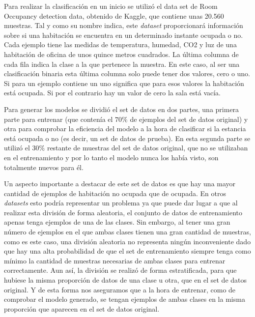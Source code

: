 \documentclass[a4paper, 12pt]{book}
\begin{document}
Para realizar la clasificación en un inicio se utilizó el data set de Room Occupancy detection data\cite{DataSetOccupancy}, obtenido de Kaggle, que contiene unas 20.560 muestras. Tal y como su nombre indica, este \textit{dataset} proporcionará información sobre si una habitación se encuentra en un determinado instante ocupada o no. Cada ejemplo tiene las medidas de temperatura, humedad, CO2 y luz de una habitación de oficina de unos quince metros cuadrados. La última columna de cada fila indica la clase a la que pertenece la muestra. En este caso, al ser una clasificación binaria esta última columna solo puede tener dos valores, cero o uno. Si para un ejemplo contiene un uno significa que para esos valores la habitación está ocupada. Si por el contrario hay un valor de cero la sala está vacía. 


Para generar los modelos se dividió el set de datos en dos partes, una primera parte para entrenar (que contenía el $70\%$ de ejemplos del set de datos original) y otra para comprobar la eficiencia del modelo a la hora de clasificar si la estancia está ocupada o no (es decir, un set de datos de prueba). En esta segunda parte se utilizó el $30\%$ restante de muestras del set de datos original, que no se utilizaban en el entrenamiento y por lo tanto el modelo nunca los había visto, son totalmente nuevos para él.

Un aspecto importante a destacar de este set de datos es que hay una mayor cantidad de ejemplos de habitación no ocupada que de ocupada. En otros \textit{datasets} esto podría representar un problema ya que puede dar lugar a que al realizar esta división de forma aleatoria, el conjunto de datos de entrenamiento apenas tenga ejemplos de una de las clases. Sin embargo, al tener una gran número de ejemplos en el que ambas clases tienen una gran cantidad de muestras, como es este caso, una división aleatoria no representa ningún inconveniente dado que hay una alta probabilidad de que el set de entrenamiento siempre tenga como mínimo la cantidad de muestras necesarias de ambas clases para entrenar correctamente. Aun así, la división se realizó de forma estratificada, para que hubiese la misma proporción de datos de una clase u otra, que en el set de datos original. Y de esta forma nos aseguramos que a la hora de entrenar, como de comprobar el modelo generado, se tengan ejemplos de ambas clases en la misma proporción que aparecen en el set de datos original.
\end{document}
